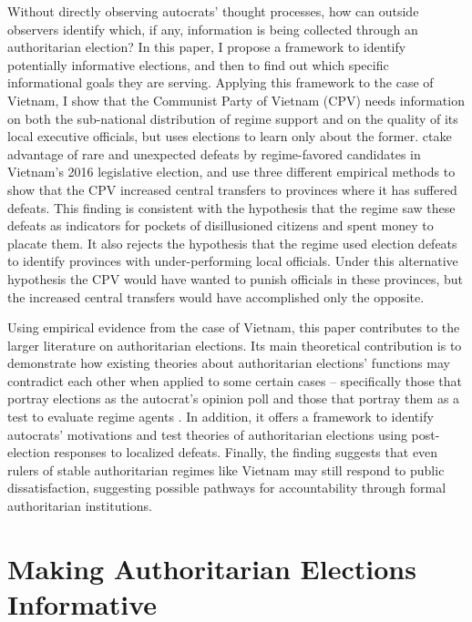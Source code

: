 \documentclass[12pt]{article}
\newcommand{\1}{\mathbbm{1}}
\begin{document}
Without directly observing autocrats' thought processes, how can outside observers identify which, if any, information is being collected through an authoritarian election? In this paper, I propose a framework to identify potentially informative elections, and then to find out which specific informational goals they are serving. Applying this framework to the case of Vietnam, I show that the Communist Party of Vietnam (CPV) needs information on both the sub-national distribution of regime support and on the quality of its local executive officials, but uses elections to learn only about the former. ctake advantage of rare and unexpected defeats by regime-favored candidates in Vietnam's 2016 legislative election, and use three different empirical methods to show that the CPV increased central transfers to provinces where it has suffered defeats. This finding is consistent with the hypothesis that the regime saw these defeats as indicators for pockets of disillusioned citizens and spent money to placate them. It also rejects the hypothesis that the regime used election defeats to identify provinces with under-performing local officials. Under this alternative hypothesis the CPV would have wanted to punish officials in these provinces, but the increased central transfers would have accomplished only the opposite.

Using empirical evidence from the case of Vietnam, this paper contributes to the larger literature on authoritarian elections. Its main theoretical contribution is to demonstrate how existing theories about authoritarian elections' functions may contradict each other when applied to some certain cases -- specifically those that portray elections as the autocrat's opinion poll \citep[e.g.][]{Miller2015, Magaloni2006, Blaydes2010} and those that portray them as a test to evaluate regime agents \citep[e.g.][]{Magaloni2006, Blaydes2010,Myagkov2009,RundlettSvolik2016}. In addition, it offers a framework to identify autocrats' motivations and test theories of authoritarian elections using post-election responses to localized defeats. Finally, the finding suggests that even rulers of stable authoritarian regimes like Vietnam may still respond to public dissatisfaction, suggesting possible pathways for accountability through formal authoritarian institutions.

\section{Making Authoritarian Elections Informative}
\label{sec:lit_review}
\end{document}
